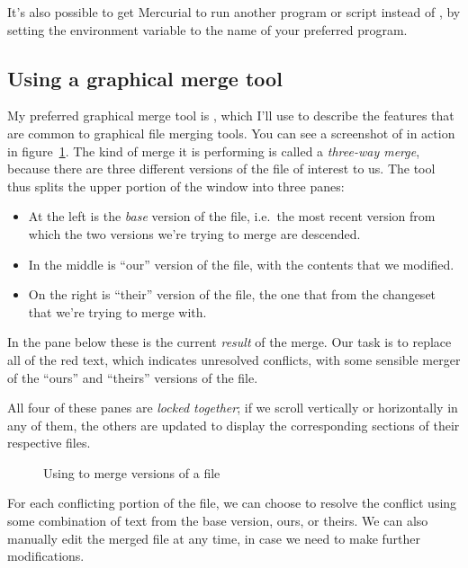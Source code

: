 It's also possible to get Mercurial to run another program or script
instead of , by setting the 
environment variable to the name of your preferred program.

\subsection{Using a graphical merge tool}

My preferred graphical merge tool is , which I'll use
to describe the features that are common to graphical file merging
tools.  You can see a screenshot of  in action in
figure~\ref{fig:tour-merge:kdiff3}.  The kind of merge it is
performing is called a \emph{three-way merge}, because there are three
different versions of the file of interest to us.  The tool thus
splits the upper portion of the window into three panes:
\begin{itemize}
\item At the left is the \emph{base} version of the file, i.e.~the
  most recent version from which the two versions we're trying to
  merge are descended.
\item In the middle is ``our'' version of the file, with the contents
  that we modified.
\item On the right is ``their'' version of the file, the one that
  from the changeset that we're trying to merge with.
\end{itemize}
In the pane below these is the current \emph{result} of the merge.
Our task is to replace all of the red text, which indicates unresolved
conflicts, with some sensible merger of the ``ours'' and ``theirs''
versions of the file.

All four of these panes are \emph{locked together}; if we scroll
vertically or horizontally in any of them, the others are updated to
display the corresponding sections of their respective files.

\begin{figure}[ht]
  \centering
  \caption{Using  to merge versions of a file}
  \label{fig:tour-merge:kdiff3}
\end{figure}

For each conflicting portion of the file, we can choose to resolve
the conflict using some combination of text from the base version,
ours, or theirs.  We can also manually edit the merged file at any
time, in case we need to make further modifications.

